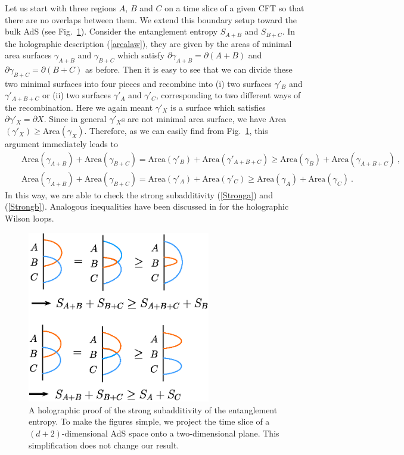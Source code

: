 \documentclass[12pt]{article}
\def\de{\partial}
\def\no{\nonumber \\}
\def\ba{\begin{eqnarray}}
\def\ea{\end{eqnarray}}
\begin{document}
Let us start with three regions $A$, $B$ and $C$ on a time slice of a given CFT so that there are no
overlaps between them. We extend this boundary setup toward the bulk AdS
(see Fig.\ \ref{Fig:SSA}).
Consider the entanglement entropy $S_{A+B}$ and $S_{B+C}$. In the holographic
description (\ref{arealaw}), they are given by the areas of minimal area surfaces $\gamma_{A+B}$ and
$\gamma_{B+C}$ which satisfy $\de \gamma_{A+B}=\de (A+B)$ and $\de \gamma_{B+C}=\de (B+C)$ as before.
Then it is easy to see that we can divide these two minimal surfaces into four pieces and
recombine into (i) two surfaces $\gamma'_B$ and $\gamma'_{A+B+C}$
or (ii) two surfaces $\gamma'_A$ and $\gamma'_C$, corresponding to two different ways of the
recombination. Here we again
meant $\gamma'_X$ is a surface which satisfies $\de \gamma'_X=\de X$.
Since in general $\gamma'_X$s are not minimal area surface, we have Area$(\gamma'_X)\geq $Area$(\gamma_X)$.
Therefore, as we can easily find from Fig.\ \ref{Fig:SSA}, this argument immediately leads to
\ba
&& \!\!\!\! \mbox{Area}(\gamma_{A+B})+\mbox{Area}(\gamma_{B+C})
=\mbox{Area}(\gamma'_{B})+\mbox{Area}(\gamma'_{A+B+C})\geq
\mbox{Area}(\gamma_{B})+\mbox{Area}(\gamma_{A+B+C}) \ , \no
&& \!\!\!\! \mbox{Area}(\gamma_{A+B})+\mbox{Area}(\gamma_{B+C})
=\mbox{Area}(\gamma'_{A})+\mbox{Area}(\gamma'_{C})\geq
\mbox{Area}(\gamma_{A})+\mbox{Area}(\gamma_{C}) \ .
\ea
In this way, we are able to check the strong subadditivity (\ref{Stronga}) and (\ref{Strongb}).
Analogous inequalities have been discussed in \cite{Hirata:2008ms} for the holographic
Wilson loops.


\begin{figure}
\begin{center}
\includegraphics[width=8cm,clip]{SSA.eps}
\end{center}
\caption{
\label{Fig:SSA}
A holographic proof of the strong subadditivity of the entanglement entropy. To make the figures simple,
we project the time slice of a $(d+2)$-dimensional AdS space onto a two-dimensional plane. This
simplification does not change our result.}
\end{figure}
\end{document}
